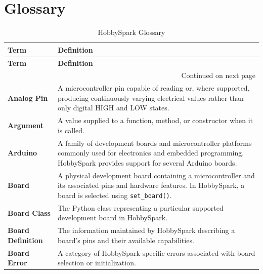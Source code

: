 \documentclass[11pt]{book}
\begin{document}
\chapter{Glossary}

\begin{longtable}{p{} p{}}

    \caption{HobbySpark Glossary}
    \label{tab:glossary} \\

    \toprule
    \textbf{Term} & \textbf{Definition} \\
    \midrule
    \endfirsthead

    \toprule
    \textbf{Term} & \textbf{Definition} \\
    \midrule
    \endhead

    \midrule
    \multicolumn{2}{r}{Continued on next page} \\
    \endfoot

    \bottomrule
    \endlastfoot

    \textbf{Analog Pin} &
    A microcontroller pin capable of reading or, where supported, producing continuously varying electrical values rather than only digital HIGH and LOW states. \\

    \textbf{Argument} &
    A value supplied to a function, method, or constructor when it is called. \\

    \textbf{Arduino} &
    A family of development boards and microcontroller platforms commonly used for electronics and embedded programming. HobbySpark provides support for several Arduino boards. \\

    \textbf{Board} &
    A physical development board containing a microcontroller and its associated pins and hardware features. In HobbySpark, a board is selected using \texttt{set\_board()}. \\

    \textbf{Board Class} &
    The Python class representing a particular supported development board in HobbySpark. \\

    \textbf{Board Definition} &
    The information maintained by HobbySpark describing a board's pins and their available capabilities. \\

    \textbf{Board Error} &
    A category of HobbySpark-specific errors associated with board selection or initialization. \\


\end{longtable}
\end{document}
